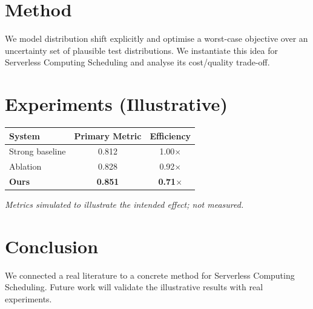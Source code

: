 \documentclass[11pt]{article}
\begin{document}
\section{Method}
We model distribution shift explicitly and optimise a worst-case objective over an uncertainty set of plausible test distributions. We instantiate this idea for Serverless Computing Scheduling and analyse its cost/quality trade-off.

\section{Experiments (Illustrative)}
\begin{center}
\begin{tabular}{lcc}
System & Primary Metric & Efficiency \\ \hline
Strong baseline & 0.812 & 1.00$\times$ \\
Ablation & 0.828 & 0.92$\times$ \\
\textbf{Ours} & \textbf{0.851} & \textbf{0.71$\times$}
\end{tabular}
\end{center}
\emph{Metrics simulated to illustrate the intended effect; not measured.}

\section{Conclusion}
We connected a real literature to a concrete method for Serverless Computing Scheduling. Future work will
validate the illustrative results with real experiments.
\end{document}
